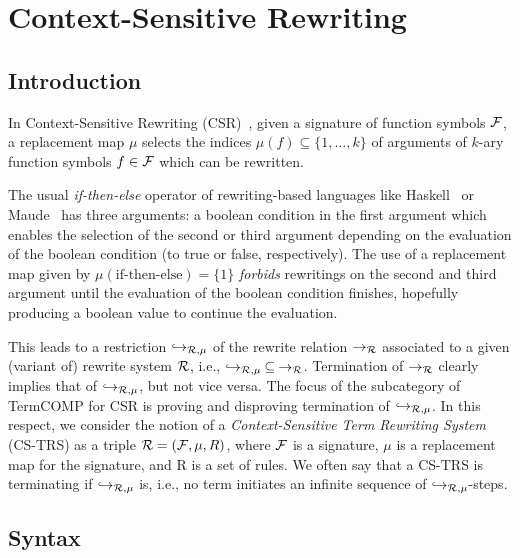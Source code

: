 \chapter{Context-Sensitive Rewriting}\label{chap:CSTRS}

\section{Introduction}

In Context-Sensitive Rewriting (CSR)~\cite{lucas2020ContextSensitiveRewriting}, given a signature of function symbols ${\cal F}$, a replacement map $\mu$ selects the indices $\mu(f)\subseteq\{1,\ldots,k\}$ of arguments of $k$-ary function symbols $f\in{\cal F}$ which can be rewritten.
%
\begin{example}
The usual \emph{if-then-else} operator of rewriting-based languages like Haskell~\cite{hudak1992ReportProgrammingLanguage} or Maude~\cite{clavel2007AllAboutMaude} has three arguments: a boolean condition in the first argument which enables the selection of the second or third argument depending on the evaluation of the boolean condition (to true or false, respectively).
%
The use of a replacement map given by $\mu(\text{if-then-else})=\{1\}$ \emph{forbids} rewritings on the second and third argument until the evaluation of the boolean condition finishes, hopefully producing a boolean value to continue the evaluation.
\end{example}

This leads to a restriction 
$\hookrightarrow_{\cal R,\mu}$ of the rewrite relation $\to_{\cal R}$ associated to a given (variant of) rewrite system ${\cal R}$, i.e., 
$\hookrightarrow_{\cal R,\mu}\:\subseteq\:\to_{\cal R}$.
%
Termination of $\to_{\cal R}$ clearly implies that of $\hookrightarrow_{\cal R,\mu}$, but not vice versa.
%
The focus of the subcategory of TermCOMP for CSR is proving and disproving termination of $\hookrightarrow_{\cal R,\mu}$.
%
In this respect, we consider the notion of a \emph{Context-Sensitive Term Rewriting System} (CS-TRS) as a triple ${\cal R}=({\cal F},\mu,R)$, where ${\cal F}$ is a signature, $\mu$ is a replacement map for the signature, and R is a set of rules.
%
We often say that a CS-TRS is terminating if 
$\hookrightarrow_{{\cal R},\mu}$ is, i.e., no term initiates an infinite sequence of $\hookrightarrow_{{\cal R},\mu}$-steps.


\section{Syntax}

